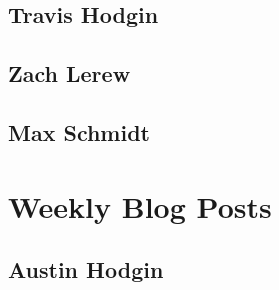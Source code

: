 \documentclass[onecolumn, draftclsnofoot,10pt, compsoc]{IEEEtran}
\begin{document}
		\subsection{Travis Hodgin}
		
		\subsection{Zach Lerew}
		
		\subsection{Max Schmidt}
		

	\section{Weekly Blog Posts}
		\subsection{Austin Hodgin}
\end{document}
